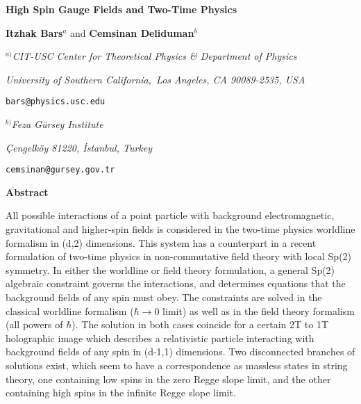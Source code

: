 \documentclass[a4paper,12pt]{article}
\begin{document}
\thispagestyle{empty}


{\small \hfill }

{\vskip0.5cm}

\begin{center}
{\Large \textbf{High Spin Gauge Fields and Two-Time Physics\\[0pt]
}}

\bigskip

{\vskip0.5cm}

\textbf{Itzhak Bars}$^{a}$ \textrm{and} \textbf{Cemsinan Deliduman}$^{b}$

{\vskip0.5cm}

$^{a)}$\textsl{CIT-USC Center for Theoretical Physics \& Department of
Physics}

\textsl{University of Southern California,\ Los Angeles, CA 90089-2535, USA}

\texttt{bars@physics.usc.edu}

{\vskip0.5cm}

$^{b)}$\textsl{Feza G\"{u}rsey Institute}

\textsl{\c{C}engelk\"{o}y 81220, \.{I}stanbul, Turkey}

\texttt{cemsinan@gursey.gov.tr}

{\vskip1.0cm}

\textbf{Abstract}

{\vskip0.5cm}
\end{center}

All possible interactions of a point particle with background
electromagnetic, gravitational and higher-spin fields is considered in the
two-time physics worldline formalism in (d,2) dimensions. This system has a
counterpart in a recent formulation of two-time physics in non-commutative
field theory with local Sp(2) symmetry. In either the worldline or field
theory formulation, a general Sp(2) algebraic constraint governs the
interactions, and determines equations that the background fields of any
spin must obey. The constraints are solved in the classical worldline
formalism ($\hbar \rightarrow 0$ limit) as well as in the field theory
formalism (all powers of $\hbar $). The solution in both cases coincide for
a certain 2T to 1T holographic image which describes a relativistic particle
interacting with background fields of any spin in (d-1,1) dimensions. Two
disconnected branches of solutions exist, which seem to have a
correspondence as massless states in string theory, one containing low spins
in the zero Regge slope limit, and the other containing high spins in the
infinite Regge slope limit. \newpage {}
\end{document}
